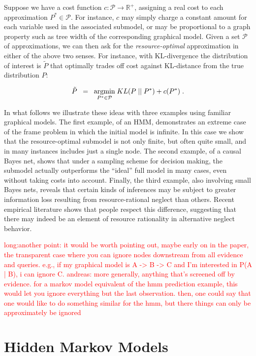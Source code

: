 \documentclass[10pt,letterpaper]{article}
\newcommand{\red}[1]{\textcolor{Red}{#1}}
\begin{document}
Suppose we have a cost function $c: \mathcal{P}\rightarrow\mathbb{R}^+$, assigning a real cost to each approximation $P^* \in \mathcal{P}$. For instance, $c$ may simply charge a constant amount for each variable used in the associated submodel, or may be proportional to a graph property such as tree width of the corresponding graphical model. Given a set $\mathcal{P}$ of approximations, we can then ask for the \emph{resource-optimal} approximation  in either of the above two senses. For instance, with KL-divergence the distribution of interest is $\tilde{P}$ that optimally trades off cost against KL-distance from the true distribution $P$: 

\begin{equation} \tilde{P} \;\;= \;\; \underset{P^*\in\mathcal{P}}{\textnormal{argmin}} \; KL(P\;||\;P^*) + c(P^*)\;.\label{optimal}\end{equation}


In what follows we illustrate these ideas with three examples using familiar graphical models. The first example, of an HMM, demonstrates an extreme case of the frame problem in which the initial model is infinite. In this case we show that the resource-optimal submodel is not only finite, but often quite small, and in many instances includes just a single node. The second example, of a causal Bayes net, shows that under a sampling scheme for decision making, the submodel actually outperforms the ``ideal'' full model in many cases, even without taking costs into account. Finally, the third example, also involving small Bayes nets, reveals that certain kinds of inferences may be subject to greater information loss resulting from resource-rational neglect than others. Recent empirical literature shows that people respect this difference, suggesting that there may indeed be an element of resource rationality in alternative neglect behavior.

\red{
long:another point: it would be worth pointing out, maybe early on in the paper, the transparent case where you can ignore nodes downstream from all evidence and queries. e.g., if my graphical model is A -> B -> C and I'm interested in P(A | B), i can ignore C.
andreas: more generally, anything that's screened off by evidence. for a markov model equivalent of the hmm prediction example, this would let you ignore everything but the last observation. then, one could say that one would like to do something similar for the hmm, but there things can only be approximately be ignored
}
\section{Hidden Markov Models}
\end{document}
